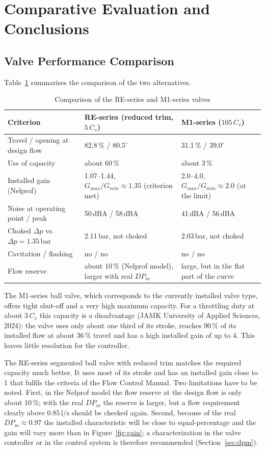 \documentclass[12pt,a4paper]{article}
\begin{document}
\section{Comparative Evaluation and Conclusions}

\subsection{Valve Performance Comparison}
Table~\ref{tab:compare} summarises the comparison of the two alternatives.

\begin{table}[!htb]
\centering
\caption{Comparison of the RE-series and M1-series valves}
\label{tab:compare}
\small
\begin{tabularx}{\textwidth}{@{}lXX@{}}
\toprule
Criterion & RE-series (reduced trim, $5\,C_v$) & M1-series ($105\,C_v$) \\
\midrule
Travel / opening at design flow & 82.8\,\% / $80.5^\circ$ & 31.1\,\% / $39.0^\circ$ \\
Use of capacity & about 60\,\% & about 3\,\% \\
Installed gain (Nelprof) & 1.07--1.44, $G_{max}/G_{min} \approx 1.35$ (criterion met) & 2.0--4.0, $G_{max}/G_{min} \approx 2.0$ (at the limit) \\
Noise at operating point / peak & 50\,dBA / 58\,dBA & 41\,dBA / 56\,dBA \\
Choked $\Delta p$ vs.\ $\Delta p = 1.35\,\text{bar}$ & 2.11\,bar, not choked & 2.03\,bar, not choked \\
Cavitation / flashing & no / no & no / no \\
Flow reserve & about 10\,\% (Nelprof model), larger with real $DP_m$ & large, but in the flat part of the curve \\
\bottomrule
\end{tabularx}
\end{table}

The M1-series ball valve, which corresponds to the currently installed valve type, offers tight shut-off and a very high maximum capacity. For a throttling duty at about $3\,C_v$ this capacity is a disadvantage (JAMK University of Applied Sciences, 2024): the valve uses only about one third of its stroke, reaches 90\,\% of its installed flow at about 36\,\% travel and has a high installed gain of up to 4. This leaves little resolution for the controller.

The RE-series segmented ball valve with reduced trim matches the required capacity much better. It uses most of its stroke and has an installed gain close to 1 that fulfils the criteria of the Flow Control Manual. Two limitations have to be noted. First, in the Nelprof model the flow reserve at the design flow is only about 10\,\%; with the real $DP_m$ the reserve is larger, but a flow requirement clearly above $0.85\,\text{l/s}$ should be checked again. Second, because of the real $DP_m \approx 0.97$ the installed characteristic will be close to equal-percentage and the gain will vary more than in Figure~\ref{fig:gain}; a characterization in the valve controller or in the control system is therefore recommended (Section~\ref{sec:dpm}).
\end{document}

